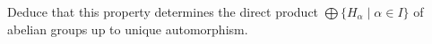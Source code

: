 \documentclass[12pt]{article}
\begin{document}
\begin{enumerate}
       Deduce that this property determines the direct product $\bigoplus\{H_\alpha\mid \alpha\in I\}$ of abelian groups up to
       unique automorphism. 

% 





\end{enumerate}
\end{document}
